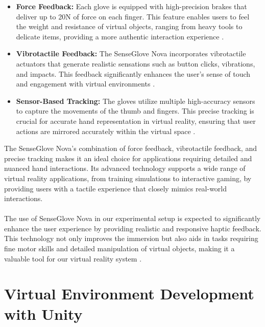 \begin{itemize}
\item \textbf{Force Feedback:} Each glove is equipped with high-precision brakes that deliver up to 20N of force on each finger. This feature enables users to feel the weight and resistance of virtual objects, ranging from heavy tools to delicate items, providing a more authentic interaction experience \cite{senseglove_nova}.
\item \textbf{Vibrotactile Feedback:} The SenseGlove Nova incorporates vibrotactile actuators that generate realistic sensations such as button clicks, vibrations, and impacts. This feedback significantly enhances the user's sense of touch and engagement with virtual environments \cite{vibrotactile_feedback}.

\item \textbf{Sensor-Based Tracking:} The gloves utilize multiple high-accuracy sensors to capture the movements of the thumb and fingers. This precise tracking is crucial for accurate hand representation in virtual reality, ensuring that user actions are mirrored accurately within the virtual space \cite{sensor_tracking}.
\end{itemize}
\noindent
The SenseGlove Nova's combination of force feedback, vibrotactile feedback, and precise tracking makes it an ideal choice for applications requiring detailed and nuanced hand interactions. Its advanced technology supports a wide range of virtual reality applications, from training simulations to interactive gaming, by providing users with a tactile experience that closely mimics real-world interactions.\\ \\
The use of SenseGlove Nova in our experimental setup is expected to significantly enhance the user experience by providing realistic and responsive haptic feedback. This technology not only improves the immersion but also aids in tasks requiring fine motor skills and detailed manipulation of virtual objects, making it a valuable tool for our virtual reality system \cite{advanced_haptic_gloves_review}.

\section{Virtual Environment Development with Unity}
\label{subsec:VirtualEnvironmentDevelopmentWithUnity}

